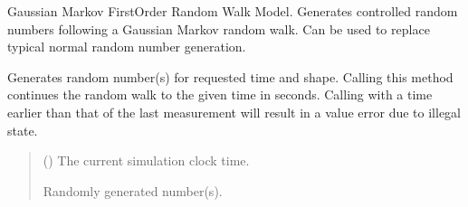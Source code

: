 \documentclass[letterpaper,10pt,english]{sphinxmanual}
\begin{document}
\begin{fulllineitems}
\label{\detokenize{modules/util/rng:qnav.util.rng.GaussianMarkov}}
\pysigstartsignatures
{}
\pysigstopsignatures
\sphinxAtStartPar
Gaussian Markov First\sphinxhyphen{}Order Random Walk Model.
Generates controlled random numbers following a Gaussian Markov random
walk. Can be used to replace typical normal random number generation.

\begin{fulllineitems}
\label{\detokenize{modules/util/rng:qnav.util.rng.GaussianMarkov.get_random}}
\pysigstartsignatures
{}
\pysigstopsignatures
\sphinxAtStartPar
Generates random number(s) for requested time and shape.
Calling this method continues the random walk to the given time in
seconds. Calling with a time earlier than that of the last
measurement will result in a value error due to illegal state.
\begin{quote}\begin{description}
\sphinxAtStartPar
{} () \textendash{} The current simulation clock time.

\sphinxAtStartPar
Randomly generated number(s).


\end{description}
\end{quote}
\end{fulllineitems}
\end{fulllineitems}
\end{document}
